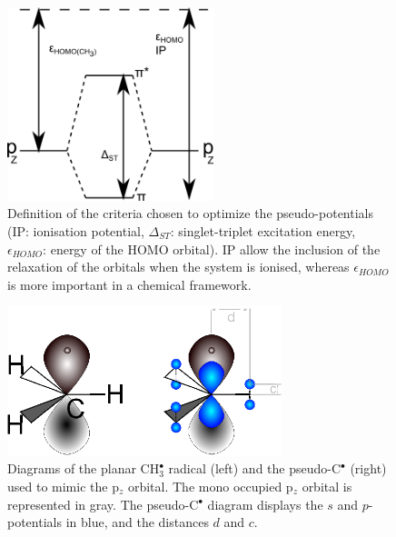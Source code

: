 \documentclass[12pt]{article}
\begin{document}
\begin{figure}
\begin{center}
\includegraphics[width=6cm]{diagram.png}
\end{center}
\vspace{0.25in}
\hspace*{3in}
	\caption{Definition of the criteria chosen to optimize the pseudo-potentials
	(IP: ionisation potential, $\Delta_{ST}$: singlet-triplet excitation energy, $\epsilon_{HOMO}$: energy of the HOMO orbital).
	IP allow the inclusion of the relaxation of the orbitals when the system is ionised, whereas $\epsilon_{HOMO}$ is more important
	in a chemical framework.}
\label{figure:diagram}
\end{figure}

\begin{figure}
\begin{center}
\includegraphics[width=8cm]{scheme_complete.eps}
\end{center}
\caption{Diagrams of the planar CH\(^{\bullet}_{3}\) radical (left) and the pseudo-C\(^{\bullet}\) (right)
used to mimic the p$_z$ orbital.
The mono occupied p$_z$ orbital is represented in gray.
The pseudo-C\(^{\bullet}\) diagram displays the \(s\) and \(p\)-potentials in blue,
and the distances \(d\) and \(c\).}
\label{figure:ref_pseudo_diagram}
\end{figure}
\end{document}

